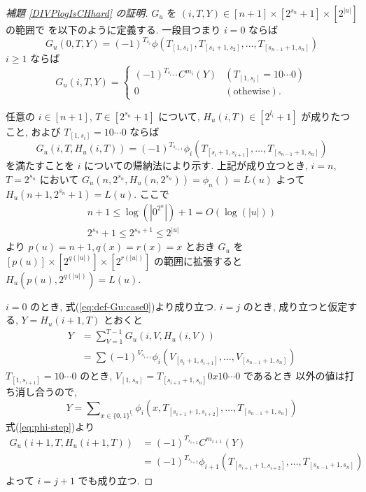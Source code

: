 \begin{proof}[\rm 補題 \ref{DIVPlogIsCHhard} の証明]
 $G_u$ を $(i, T, Y) \in [n+1] \times [2^{s_n}+1] \times [2^{|u|}]$ の範囲で
 を以下のように定義する. 一段目つまり $i=0$ ならば
 \begin{equation}
  G_u(0,T,Y) = 
   (-1)^{T_{s_1}}\phi(T_{[1,s_1]}, T_{[s_1+1,s_2]},
    \dots, T_{[s_{n-1}+1,s_n]}) 
 \end{equation}
 $i \ge 1$ ならば
 \begin{equation} \label{eq:def-Gu:case0}
  G_u(i,T,Y) = 
   \begin{cases}
    (-1)^{T_{s_{i+1}}} C^{m_i}(Y) 
    & (T_{[1,s_i]} = 10 \cdots 0) \\
    0 & (\text{othewise}).
   \end{cases} 
 \end{equation}


 任意の $i \in [n+1]$, $T \in [2^{s_n}+1]$ について,
 $H_u(i,T) \in [2^{l_i}+1]$ が成りたつこと,
 および $T_{[1,s_i]} = 10 \cdots 0$ ならば
 \begin{equation} \label{eq:subformula}
  G_u(i,T,H_u(i,T)) = (-1)^{T_{s_{i+1}}} 
   \phi_i(T_{[s_i+1, s_{i+1}]}, \dots, T_{[s_{n-1}+1, s_n]})
 \end{equation}
 を満たすことを $i$ についての帰納法により示す.
 上記が成り立つとき,
 $i=n$, $T=2^{s_n}$ において $G_u(n, 2^{s_n}, H_u(n,2^{s_n})) = \phi_n() = L(u)$
 よって $H_u(n+1, 2^{s_n}+1) = L(u)$.
 ここで 
 \begin{gather}
  n+1 \le \log(|0^{2^n}|) + 1 = O(\log(|u|)) \\
  2^{s_n}+1 \le 2^{s_n+1} \le 2^{|u|}
 \end{gather}
 より $p(u) = n+1, q(x) = r(x) = x$ とおき $G_u$ を
 $[p(u)] \times [2^{q(|u|)}] \times [2^{r(|u|)}]$ の範囲に拡張すると
 $H_u(p(u), 2^{q(|u|)}) = L(u)$.

 $i=0$ のとき, 式(\ref{eq:def-Gu:case0})より成り立つ.
 $i=j$ のとき, 成り立つと仮定する, $Y = H_u(i+1, T)$ とおくと
 \begin{align}
  Y 
  &= \sum_{V = 1}^{T-1} G_u(i, V, H_u(i, V)) \\
  &= \sum (-1)^{V_{s_{i+1}}} \phi_i(V_{[s_i+1, s_{i+1}]}, 
   \dots, V_{[s_{n-1}+1, s_n]})
 \end{align}
 $T_{[1, s_{i+1}]} = 10 \cdots 0$ のとき,
 $V_{[1, s_n]} = T_{[s_{i+1}+1,s_n]} 0 x 1 0 \cdots 0$ であるとき
 以外の値は打ち消し合うので,
 \begin{equation}
  Y = \sum\nolimits_{x \in \{0,1\}^{l_i}} 
  \phi_i(x, T_{[s_{i+1}+1, s_{i+2}]}, \dots, T_{[s_{n-1}+1, s_n]})
 \end{equation}
 式(\ref{eq:phi-step})より
 \begin{align}
  G_u(i+1,T,H_u(i+1,T)) 
  &= (-1)^{T_{s_{i+2}}} C^{m_{i+1}} (Y)\\
  &= (-1)^{T_{s_{i+2}}} \phi_{i+1}(T_{[s_{i+1}+1, s_{i+2}]}, \dots, T_{[s_{n-1}+1, s_n]})
 \end{align}
 よって $i=j+1$ でも成り立つ.
 \end{proof}



